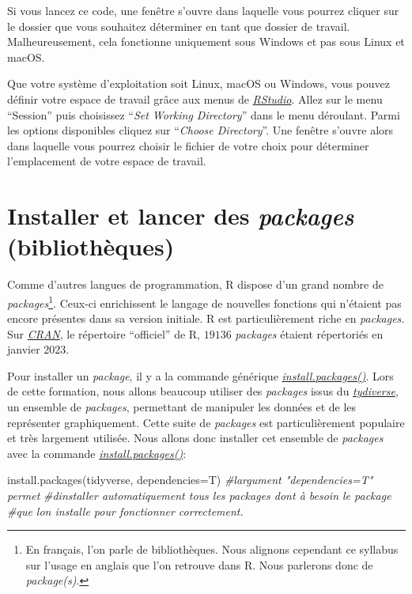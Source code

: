 \documentclass[
]{book}
\newenvironment{Shaded}{\begin{snugshade}}{\end{snugshade}}
\newcommand{\AttributeTok}[1]{\textcolor[rgb]{0.77,0.63,0.00}{#1}}
\newcommand{\CommentTok}[1]{\textcolor[rgb]{0.56,0.35,0.01}{\textit{#1}}}
\newcommand{\FunctionTok}[1]{\textcolor[rgb]{0.00,0.00,0.00}{#1}}
\newcommand{\NormalTok}[1]{#1}
\begin{document}
Si vous lancez ce code, une fenêtre s'ouvre dans laquelle vous pourrez cliquer sur le dossier que vous souhaitez déterminer en tant que dossier de travail. Malheureusement, cela fonctionne uniquement sous Windows et pas sous Linux et macOS.

Que votre système d'exploitation soit Linux, macOS ou Windows, vous pouvez définir votre espace de travail grâce aux menus de \href{https://posit.co/}{\emph{RStudio}}. Allez sur le menu ``Session'' puis choisissez ``\emph{Set Working Directory}'' dans le menu déroulant. Parmi les options disponibles cliquez sur ``\emph{Choose Directory}''. Une fenêtre s'ouvre alors dans laquelle vous pourrez choisir le fichier de votre choix pour déterminer l'emplacement de votre espace de travail.

\hypertarget{packages}{%
\section{\texorpdfstring{Installer et lancer des \emph{packages} (bibliothèques)}{Installer et lancer des packages (bibliothèques)}}\label{packages}}

Comme d'autres langues de programmation, R dispose d'un grand nombre de \emph{packages}\footnote{En français, l'on parle de bibliothèques. Nous alignons cependant ce syllabus sur l'usage en anglais que l'on retrouve dans R. Nous parlerons donc de \emph{package(s)}.}. Ceux-ci enrichissent le langage de nouvelles fonctions qui n'étaient pas encore présentes dans sa version initiale. R est particulièrement riche en \emph{packages.} Sur \href{https://cran.r-project.org/}{\emph{CRAN}}, le répertoire ``officiel'' de R, \(19136\) \emph{packages} étaient répertoriés en janvier 2023.

Pour installer un \emph{package}, il y a la commande générique \href{https://www.rdocumentation.org/packages/utils/versions/3.6.2/topics/install.packages}{\emph{install.packages()}}. Lors de cette formation, nous allons beaucoup utiliser des \emph{packages} issus du \href{https://www.tidyverse.org/}{\emph{tydiverse}}, un ensemble de \emph{packages}, permettant de manipuler les données et de les représenter graphiquement. Cette suite de \emph{packages} est particulièrement populaire et très largement utilisée. Nous allons donc installer cet ensemble de \emph{packages} avec la commande \href{https://www.rdocumentation.org/packages/utils/versions/3.6.2/topics/install.packages}{\emph{install.packages()}}:

\begin{Shaded}
\begin{Highlighting}[]
\FunctionTok{install.packages}\NormalTok{(tidyverse, }\AttributeTok{dependencies=}\NormalTok{T) }\CommentTok{\#l\textquotesingle{}argument "dependencies=T" permet}
        \CommentTok{\#d\textquotesingle{}installer automatiquement tous les packages dont à besoin le package}
        \CommentTok{\#que l\textquotesingle{}on installe pour fonctionner correctement.}
\end{Highlighting}
\end{Shaded}
\end{document}
